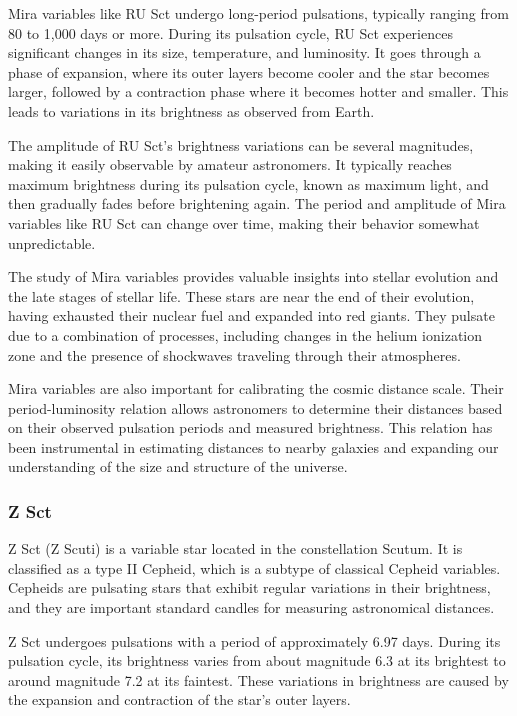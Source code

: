 Mira variables like RU Sct undergo long-period pulsations, typically ranging from 80 to 1,000 days or more. During its pulsation cycle, RU Sct experiences significant changes in its size, temperature, and luminosity. It goes through a phase of expansion, where its outer layers become cooler and the star becomes larger, followed by a contraction phase where it becomes hotter and smaller. This leads to variations in its brightness as observed from Earth.

The amplitude of RU Sct's brightness variations can be several magnitudes, making it easily observable by amateur astronomers. It typically reaches maximum brightness during its pulsation cycle, known as maximum light, and then gradually fades before brightening again. The period and amplitude of Mira variables like RU Sct can change over time, making their behavior somewhat unpredictable.

The study of Mira variables provides valuable insights into stellar evolution and the late stages of stellar life. These stars are near the end of their evolution, having exhausted their nuclear fuel and expanded into red giants. They pulsate due to a combination of processes, including changes in the helium ionization zone and the presence of shockwaves traveling through their atmospheres.

Mira variables are also important for calibrating the cosmic distance scale. Their period-luminosity relation allows astronomers to determine their distances based on their observed pulsation periods and measured brightness. This relation has been instrumental in estimating distances to nearby galaxies and expanding our understanding of the size and structure of the universe.
\subsubsection*{ Z Sct }
Z Sct (Z Scuti) is a variable star located in the constellation Scutum. It is classified as a type II Cepheid, which is a subtype of classical Cepheid variables. Cepheids are pulsating stars that exhibit regular variations in their brightness, and they are important standard candles for measuring astronomical distances.

Z Sct undergoes pulsations with a period of approximately 6.97 days. During its pulsation cycle, its brightness varies from about magnitude 6.3 at its brightest to around magnitude 7.2 at its faintest. These variations in brightness are caused by the expansion and contraction of the star's outer layers.

